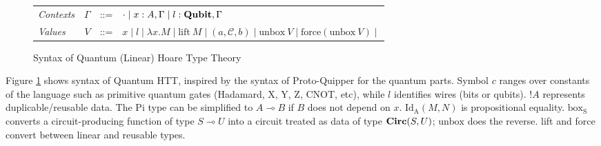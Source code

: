 \documentclass[acmsmall,nonacm,timestamp]{acmart}
\newcommand{\qwire}{\ensuremath{\mathcal{Q}\textsc{wire}}\xspace}
\newcommand{\type}[1]{\textrm{\textbf{#1}}}
\begin{document}
\begin{figure}[t]
\begin{tabular}{lrcl}
		\textit{Contexts} & $\Gamma$ & ::= & $ \cdot \mid x : A, \Gamma \mid l : \type{Qubit}, \Gamma$ \\
		\textit{Values} & $V$ & ::= & \begin{minipage}[t]{0.5\columnwidth}%
	$ x \mid l \mid \lambda x.M \mid \mathrm{lift}~M \mid (a, \mathcal{C}, b) \mid \mathrm{unbox}~V \mid \mathrm{force}(\mathrm{unbox}~V) \mid $
\end{minipage}\\
	\end{tabular}
	\caption{Syntax of Quantum (Linear) Hoare Type Theory}
	\label{fig:syntax}
\end{figure}

Figure \ref{fig:syntax} shows syntax of Quantum HTT, inspired by the syntax of Proto-Quipper for the quantum parts. Symbol $c$ ranges over constants of the language such as primitive quantum gates (Hadamard, X, Y, Z, CNOT, etc), while $l$ identifies wires (bits or qubits). $!A$ represents duplicable/reusable data. The Pi type can be simplified to $A \multimap B$ if $B$ does not depend on $x$. $\mathrm{Id_A}(M, N)$ is propositional equality. $\mathrm{box_S}$ converts a circuit-producing function of type $S \multimap U$ into a circuit treated as data of type $\type{Circ}(S, U)$; $\mathrm{unbox}$ does the reverse. lift and force convert between linear and reusable types.



%
%
%
%
%
\end{document}
